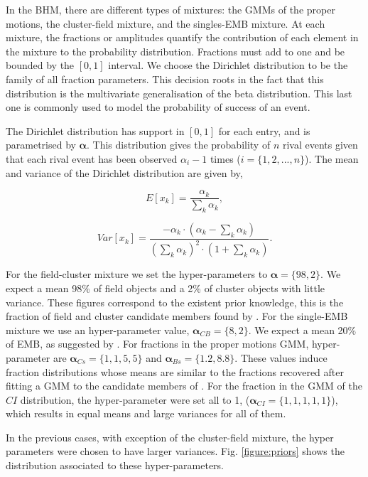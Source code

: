In the BHM, there are different types of mixtures: the GMMs of the proper motions, the cluster-field mixture, and the singles-EMB mixture. At each mixture, the fractions or amplitudes quantify the contribution of each element in the mixture to the probability distribution. Fractions must add to one and be bounded by the $[0,1]$ interval.  We choose the Dirichlet distribution to be the family of all fraction parameters. This decision roots in the fact that this distribution is the multivariate generalisation of the beta distribution. This last one is commonly used to model the probability of success of an event.

The Dirichlet distribution has support in $[0,1]$ for each entry, and is parametrised by $\boldsymbol{\alpha}$. This distribution gives the probability of $n$ rival events given that each rival event has been observed $\alpha_i-1$ times ($i=\{1,2,...,n\}$). The mean and variance of the Dirichlet distribution are given by,

\begin{equation}
E[x_k]=\frac{\alpha_k}{\sum_k \alpha_k},
\end{equation}

\begin{equation}
Var[x_k]=\frac{-\alpha_k\cdot (\alpha_k -\sum_k \alpha_k)}{(\sum_k \alpha_k)^2 \cdot (1+\sum_k \alpha_k)}.
\end{equation}

For the field-cluster mixture we set the hyper-parameters to $\boldsymbol{\alpha}=\{98,2\}$. We expect a mean 98\% of field objects and a 2\% of cluster objects with little variance. These figures correspond to the existent prior knowledge, this is the fraction of field and cluster candidate members found by \citet{Bouy2015}. 
For the single-EMB mixture we use an hyper-parameter value, $\boldsymbol{\alpha}_{CB}=\{8,2\}$. We expect a mean 20\% of EMB, as suggested by \citet{Bouy2015}. 
For fractions in the proper motions GMM, hyper-parameter are $\boldsymbol{\alpha}_{Cs}=\{1,1,5,5\}$ and $\boldsymbol{\alpha}_{Bs}=\{1.2,8.8\}$. These values induce fraction distributions whose means are similar to the fractions recovered after fitting a GMM to the  candidate members of \citet{Bouy2015}. 
For the fraction in the GMM of the $CI$ distribution, the hyper-parameter were set all to 1, ($\boldsymbol{\alpha}_{CI}=\{1,1,1,1,1\}$), which results in equal means and large variances for all of them. 

In the previous cases, with exception of the cluster-field mixture, the hyper parameters were chosen to have larger variances. Fig. \ref{figure:priors} shows the distribution associated to these hyper-parameters.

